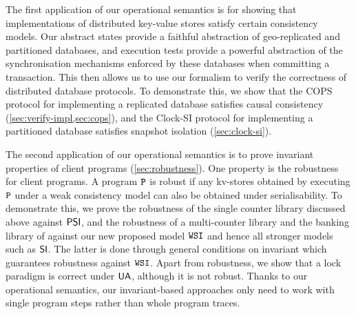 The first application of our operational
semantics is for showing that implementations of distributed
key-value stores satisfy certain consistency models. 
Our abstract states provide a 
faithful abstraction of geo-replicated and partitioned
databases, and execution tests provide a powerful abstraction of the synchronisation mechanisms 
enforced by these databases when committing a transaction. 
This then allows us to use our 
formalism to verify the correctness of distributed database protocols. 
To demonstrate this, we show that the
COPS protocol \citep{cops} for implementing a replicated database satisfies causal consistency  (\cref{sec:verify-impl,sec:cops}), 
and the Clock-SI protocol \citep{clocksi} for implementing a
partitioned database satisfies snapshot isolation (\cref{sec:clock-si}). 


The second application of our operational semantics is to prove
invariant properties of client programs (\cref{sec:robustness}).
One property is the robustness for client programs. %
A program \(\mathtt{P}\) is robust if any kv-stores obtained 
by executing \(\mathtt{P}\) under a weak consistency model can also be obtained under serialisability.
To demonstrate this, we prove the robustness of the single
counter library discussed above against \(\mathsf{PSI}\), 
and the robustness of a multi-counter library and the banking library of \citet{bank-example-wsi}
against our new proposed model \(\mathtt{WSI}\) and hence all stronger models such as \(\mathsf{SI}\).
The latter is done through general conditions on invariant which guarantees robustness against \( \mathtt{WSI} \).
Apart from robustness,
we show that a lock paradigm is correct under \( \mathsf{UA} \), 
although it is not robust.
Thanks to our operational semantics, 
our invariant-based approaches only need to work with single program steps 
rather than whole program traces.
